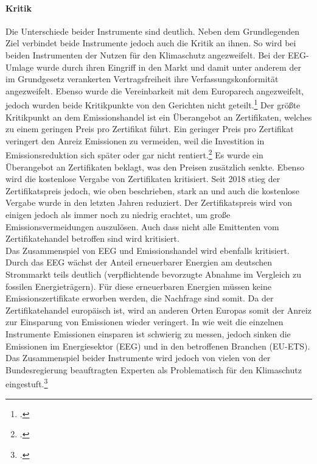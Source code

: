 \paragraph{Kritik}
Die Unterschiede beider Instrumente sind deutlich. 
Neben dem Grundlegenden Ziel verbindet beide Instrumente jedoch auch die Kritik an ihnen.
So wird bei beiden Instrumenten der Nutzen für den Klimaschutz angezweifelt.
Bei der EEG-Umlage wurde durch ihren Eingriff in den Markt und damit unter anderem der im Grundgesetz verankerten Vertragsfreiheit ihre Verfassungskonformität angezweifelt. Ebenso wurde die Vereinbarkeit mit dem Europarech angezweifelt, jedoch wurden beide Kritikpunkte von den Gerichten nicht geteilt.\footcite[Vgl.][]{Bundesverfassungsgericht2016}
Der größte Kritikpunkt an dem Emissionshandel ist ein Überangebot an Zertifikaten, welches zu einem geringen Preis pro Zertifikat führt.
Ein geringer Preis pro Zertifikat veringert den Anreiz Emissionen zu vermeiden, weil die Investition in Emissionsreduktion sich später oder gar nicht rentiert.\footcite[Vgl. auch im Folgenden][]{Matthes2017}
Es wurde ein Überangebot an Zertifikaten beklagt, was den Preisen zusätzlich senkte.
Ebenso wird die kostenlose Vergabe von Zertifikaten kritisiert.
Seit 2018 stieg der Zertifikatspreis jedoch, wie oben beschrieben, stark an und auch die kostenlose Vergabe wurde in den letzten Jahren reduziert.
Der Zertifikatspreis wird von einigen jedoch als immer noch zu niedrig erachtet, um große Emissionsvermeidungen auszulösen.
Auch dass nicht alle Emittenten vom Zertifikatehandel betroffen sind wird kritisiert.\\
Das Zusammenspiel von EEG und Emissionshandel wird ebenfalls kritisiert.
Durch das EEG wächst der Anteil erneuerbarer Energien am deutschen Strommarkt teils deutlich (verpflichtende bevorzugte Abnahme im Vergleich zu fossilen Energieträgern).
Für diese erneuerbaren Energien müssen keine Emissionszertifikate erworben werden, die Nachfrage sind somit.
Da der Zertifikatehandel europäisch ist, wird an anderen Orten Europas somit der Anreiz zur Einsparung von Emissionen wieder veringert.
In wie weit die einzelnen Instrumente Emissionen einsparen ist schwierig zu messen, jedoch sinken die Emissionen im Energiesektor (EEG) und in den betroffenen Branchen (EU-ETS). Das Zusammenspiel beider Instrumente wird jedoch von vielen von der Bundesregierung beauftragten Experten als Problematisch für den Klimaschutz eingestuft.\footcite[Vgl. u.a.][]{SachverstandigenratzurBegutachtungdergesamtwirtschaftlichenEntwicklung}
